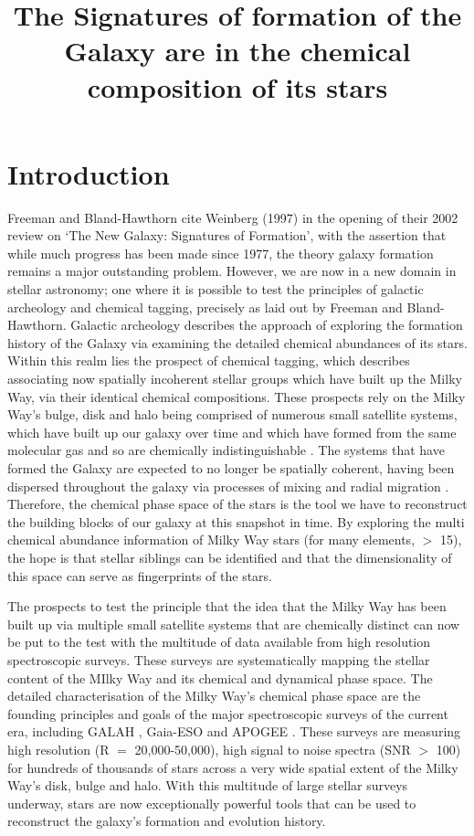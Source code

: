 \documentclass[12pt, preprint]{aastex}
\begin{document}
\title{The Signatures of formation of the Galaxy are in the chemical composition of its stars }

\section{Introduction}\label{sec:Intro}


Freeman and Bland-Hawthorn cite Weinberg (1997) in the opening of their 2002 review on `The New Galaxy: Signatures of Formation', with the assertion that while much progress has been made since 1977, the  theory galaxy formation remains a major outstanding problem. However, we are now in a new domain in stellar astronomy; one where it is possible to test the principles of galactic archeology and chemical tagging, precisely as laid out by Freeman and Bland-Hawthorn. Galactic archeology describes the approach of exploring the formation history of the Galaxy via examining the detailed chemical abundances of its stars. Within this realm lies the prospect of chemical tagging, which describes associating now spatially incoherent stellar groups which have built up the Milky Way, via their identical chemical compositions. These prospects rely on the Milky Way's bulge, disk and halo being comprised of numerous small satellite systems, which have built up our galaxy over time and which have formed from the same molecular gas and so are chemically indistinguishable \citep[see][and references therein]{DaSilva2015}. The systems that have formed the Galaxy are expected to no longer be spatially coherent, having been dispersed throughout the galaxy via processes of mixing and radial migration \citep[e.g.][]{Roskar et al., 2009, Quillen2015}. Therefore, the chemical phase space of the stars is the tool we have to reconstruct the building blocks of our galaxy at this snapshot in time.  By exploring the multi chemical abundance information of Milky Way stars (for many elements,  $>$ 15), the hope is that stellar siblings can be identified and that the dimensionality of this space can serve as fingerprints of the stars. 

The prospects to test the principle that the idea that the Milky Way has been built up via multiple small satellite systems that are chemically distinct can now be put to the test with the multitude of data available from high resolution spectroscopic surveys. These surveys are systematically mapping the stellar content of the MIlky Way and its chemical and dynamical phase space. The detailed characterisation of the Milky Way's chemical phase space are the founding principles and goals of the major spectroscopic surveys of the current era, including GALAH \citep{Freeman2013, da Silva 2015}, Gaia-ESO \citep{Gilmore 2012} and APOGEE \citep{Majewsk2015}. These surveys are measuring high resolution (R $=$ 20,000-50,000), high signal to noise spectra (SNR $>$ 100) for hundreds of thousands of stars across a very wide spatial extent of the Milky Way's disk, bulge and halo. With this multitude of large stellar surveys underway, stars are now exceptionally powerful tools that can be used to reconstruct the galaxy's formation and evolution history.  
\end{document}
